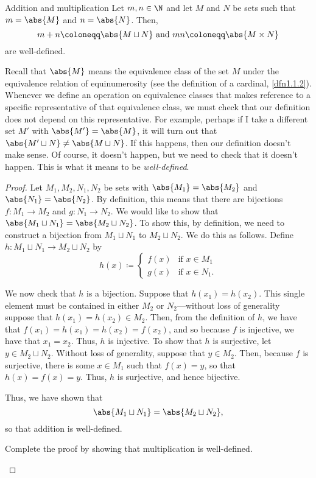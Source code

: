 \begin{prp}{Addition and multiplication}{}
Let $m,n\in \N$ and let $M$ and $N$ be sets such that $m=\abs{M}$ and $n=\abs{N}$.  Then,
\begin{equation}
m+n\coloneqq \abs{M\sqcup N}\text{ and }mn\coloneqq \abs{M\times N}
\end{equation}
are well-defined.
\begin{rmk}
Recall that $\abs{M}$ means the equivalence class of the set $M$ under the equivalence relation of equinumerosity (see the definition of a cardinal, \cref{dfn1.1.2}).  Whenever we define an operation on equivalence classes that makes reference to a specific representative of that equivalence class, we must check that our definition does not depend on this representative.  For example, perhaps if I take a different set $M'$ with $\abs{M'}=\abs{M}$, it will turn out that $\abs{M'\sqcup N}\neq \abs{M\sqcup N}$.  If this happens, then our definition doesn't make sense.  Of course, it doesn't happen, but we need to check that it doesn't happen.  This is what it means to be \emph{well-defined}.
\end{rmk}
\begin{proof}
Let $M_1,M_2,N_1,N_2$ be sets with $\abs{M_1}=\abs{M_2}$ and $\abs{N_1}=\abs{N_2}$.  By definition, this means that there are bijections $f\colon M_1\rightarrow M_2$ and $g\colon N_1\rightarrow N_2$.  We would like to show that $\abs{M_1\sqcup N_1}=\abs{M_2\sqcup N_2}$.  To show this, by definition, we need to construct a bijection from $M_1\sqcup N_1$ to $M_2\sqcup N_2$.  We do this as follows.  Define $h \colon M_1\sqcup N_1\rightarrow M_2\sqcup N_2$ by
\begin{equation}
h(x)\coloneqq \begin{cases}f(x) & \text{if }x\in M_1 \\ g(x) & \text{if }x\in N_1.\end{cases}
\end{equation}

We now check that $h$ is a bijection.  Suppose that $h(x_1)=h(x_2)$.  This single element must be contained in either $M_2$ or $N_2$---without loss of generality suppose that $h(x_1)=h(x_2)\in M_2$.  Then, from the definition of $h$, we have that $f(x_1)=h(x_1)=h(x_2)=f(x_2)$, and so because $f$ is injective, we have that $x_1=x_2$.  Thus, $h$ is injective.  To show that $h$ is surjective, let $y\in M_2\sqcup N_2$.  Without loss of generality, suppose that $y\in M_2$.  Then, because $f$ is surjective, there is some $x\in M_1$ such that $f(x)=y$, so that $h(x)=f(x)=y$.  Thus, $h$ is surjective, and hence bijective.

Thus, we have shown that
\begin{equation}
\abs{M_1\sqcup N_1}=\abs{M_2\sqcup N_2},
\end{equation}
so that addition is well-defined.

\begin{exr}[breakable=false]{}{}
Complete the proof by showing that multiplication is well-defined.
\end{exr}
\end{proof}
\end{prp}


